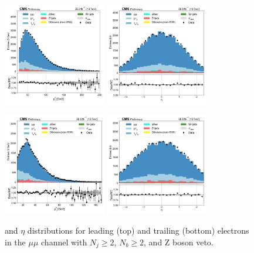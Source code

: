 \begin{figure}[htb!]
    \centering
    \includegraphics[width=0.4\textwidth]{chapters/Analysis/sectionPlots/figures/data_mc_overlays/mumu_2016_cat_gt2_gt2_b_signal_linear_lepton_lepton1_pt}
    \includegraphics[width=0.4\textwidth]{chapters/Analysis/sectionPlots/figures/data_mc_overlays/mumu_2016_cat_gt2_gt2_b_signal_linear_lepton_lepton1_eta}

    \includegraphics[width=0.4\textwidth]{chapters/Analysis/sectionPlots/figures/data_mc_overlays/mumu_2016_cat_gt2_gt2_b_signal_linear_lepton_lepton2_pt}
    \includegraphics[width=0.4\textwidth]{chapters/Analysis/sectionPlots/figures/data_mc_overlays/mumu_2016_cat_gt2_gt2_b_signal_linear_lepton_lepton2_eta}
    \caption{\pt and $\eta$ distributions for leading (top) and trailing
    (bottom) electrons in the $\mu\mu$ channel with $N_{j} \geq 2$, $N_{b}
    \geq 2$, and Z boson veto.}
    \label{fig:analysis:plots:mumu_2_kinematic}
\end{figure}


